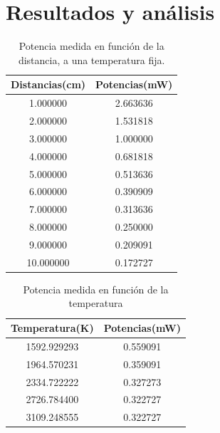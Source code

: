 \section{Resultados y análisis}
\begin{table}[!h]
	\centering
	\caption{Potencia medida en función de la distancia, a una temperatura fija.}
	\begin{tabular}{|c|c|}
		\hline
		Distancias(cm) & Potencias(mW) \\
		\hline
		1.000000       & 2.663636      \\
		2.000000       & 1.531818      \\
		3.000000       & 1.000000      \\
		4.000000       & 0.681818      \\
		5.000000       & 0.513636      \\
		6.000000       & 0.390909      \\
		7.000000       & 0.313636      \\
		8.000000       & 0.250000      \\
		9.000000       & 0.209091      \\
		10.000000      & 0.172727      \\
		\hline
	\end{tabular}
\end{table}

\begin{table}[!h]
	\centering
	\caption{Potencia medida en función de la temperatura}
	\begin{tabular}{|c|c|}
		\hline
		Temperatura(K) & Potencias(mW) \\
		\hline
		1592.929293    & 0.559091      \\
		1964.570231    & 0.359091      \\
		2334.722222    & 0.327273      \\
		2726.784400    & 0.322727      \\
		3109.248555    & 0.322727      \\
		\hline
	\end{tabular}
\end{table}


